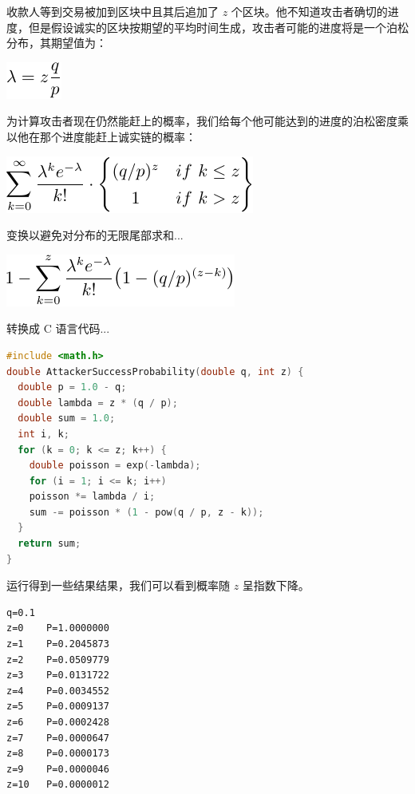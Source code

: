 \documentclass{article}
\begin{document}
收款人等到交易被加到区块中且其后追加了 $z$ 个区块。他不知道攻击者确切的进度，但是假设诚实的区块按期望的平均时间生成，攻击者可能的进度将是一个泊松分布，其期望值为：

\begin{center}
 \includegraphics{bitcoin-zh-cn-9}
\end{center}

为计算攻击者现在仍然能赶上的概率，我们给每个他可能达到的进度的泊松密度乘以他在那个进度能赶上诚实链的概率：

\begin{center}
 \includegraphics{bitcoin-zh-cn-10}
\end{center}

变换以避免对分布的无限尾部求和...

\begin{center}
 \includegraphics{bitcoin-zh-cn-11}
\end{center}

转换成 C 语言代码...

\begin{lstlisting}[language=C]
#include <math.h>
double AttackerSuccessProbability(double q, int z) {
  double p = 1.0 - q;
  double lambda = z * (q / p);
  double sum = 1.0;
  int i, k;
  for (k = 0; k <= z; k++) {
    double poisson = exp(-lambda);
    for (i = 1; i <= k; i++)
    poisson *= lambda / i;
    sum -= poisson * (1 - pow(q / p, z - k));
  }
  return sum;
}
\end{lstlisting}

运行得到一些结果结果，我们可以看到概率随 $z$ 呈指数下降。

\begin{lstlisting}
q=0.1
z=0    P=1.0000000
z=1    P=0.2045873
z=2    P=0.0509779
z=3    P=0.0131722
z=4    P=0.0034552
z=5    P=0.0009137
z=6    P=0.0002428
z=7    P=0.0000647
z=8    P=0.0000173
z=9    P=0.0000046
z=10   P=0.0000012
\end{lstlisting}
\end{document}
